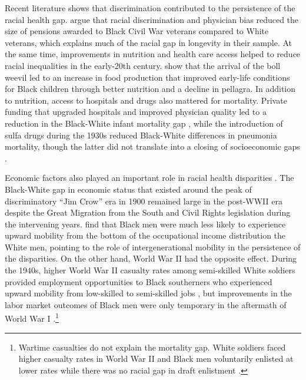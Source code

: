\documentclass[12pt]{article}
\begin{document}
Recent literature shows that discrimination contributed to the persistence of the racial health gap. 
 argue that racial discrimination and physician bias reduced the size of pensions awarded to Black Civil War veterans compared to White veterans, which explains much of the racial gap in longevity in their sample. 
At the same time, improvements in nutrition and health care access helped to reduce racial inequalities in the early-20th century. 
 show that the arrival of the boll weevil led to an increase in food production that improved early-life conditions for Black children through better nutrition and a decline in pellagra. 
In addition to nutrition, access to hospitals and drugs also mattered for mortality.  
Private funding that upgraded hospitals and improved physician quality led to a reduction in the Black-White infant mortality gap , while the introduction of sulfa drugs during the 1930s reduced Black-White differences in pneumonia mortality, though the latter did not translate into a closing of socioeconomic gaps . 

Economic factors also played an important role in racial health disparities .
The Black-White gap in economic status that existed around the peak of discriminatory ``Jim Crow'' era in 1900 remained large in the post-WWII era despite the Great Migration from the South and Civil Rights legislation during the intervening years.    
 find that Black men were much less likely to experience upward mobility from the bottom of the occupational income distribution the White men, pointing to the role of intergenerational mobility in the persistence of the disparities. 
On the other hand, World War II had the opposite effect. 
During the 1940s, higher World War II casualty rates among semi-skilled White soldiers provided employment opportunities to Black southerners who experienced upward mobility from low-skilled to semi-skilled jobs , but improvements in the labor market outcomes of Black men were only temporary in the aftermath of World War I .\footnote{Wartime casualties do not explain the mortality gap. 
White soldiers faced higher casualty rates in World War II  and Black men voluntarily enlisted at lower rates while there was no racial gap in draft enlistment . 
}
\end{document}
